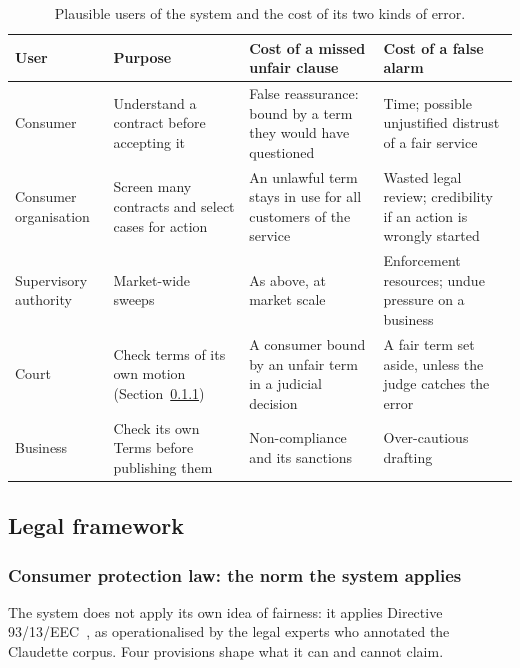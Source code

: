 \begin{table}[t]
\centering\small
\caption{Plausible users of the system and the cost of its two kinds of error.}
\label{tab:stakes}
\begin{tabularx}{\textwidth}{@{}P{2.6cm}YYY@{}}
\toprule
User & Purpose & Cost of a missed unfair clause & Cost of a false alarm \\
\midrule
Consumer & Understand a contract before accepting it & False reassurance: bound by a term they would have questioned & Time; possible unjustified distrust of a fair service \\
Consumer organisation & Screen many contracts and select cases for action & An unlawful term stays in use for all customers of the service & Wasted legal review; credibility if an action is wrongly started \\
Supervisory authority & Market-wide sweeps & As above, at market scale & Enforcement resources; undue pressure on a business \\
Court & Check terms of its own motion (Section~\ref{sec:ethics-consumer}) & A consumer bound by an unfair term in a judicial decision & A fair term set aside, unless the judge catches the error \\
Business & Check its own Terms before publishing them & Non-compliance and its sanctions & Over-cautious drafting \\
\bottomrule
\end{tabularx}
\end{table}

\subsection{Legal framework}

\subsubsection{Consumer protection law: the norm the system applies}
\label{sec:ethics-consumer}

The system does not apply its own idea of fairness: it applies Directive 93/13/EEC~\citep{dir93}, as operationalised by the legal experts who annotated the Claudette corpus. Four provisions shape what it can and cannot claim.

